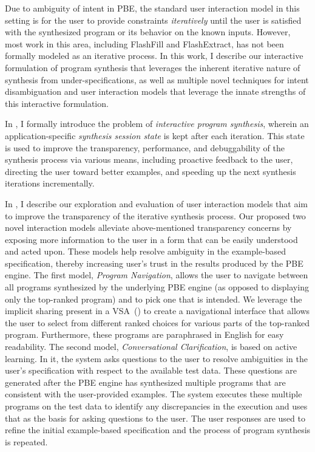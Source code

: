 Due to ambiguity of intent in PBE, the standard user interaction model in this setting is for the user to provide
constraints \emph{iteratively} until the user is satisfied with the synthesized program or its behavior on the known
inputs.
However, most work in this area, including FlashFill and FlashExtract, has not been formally modeled as an iterative
process.
In this work, I describe our interactive formulation of program synthesis that leverages the inherent iterative nature
of synthesis from under-specifications, as well as multiple novel techniques for intent disambiguation and user
interaction models that leverage the innate strengths of this interactive formulation.

In , I formally introduce the problem of \emph{interactive program synthesis}, wherein an
application-specific \emph{synthesis session state} is kept after each iteration.
This state is used to improve the transparency, performance, and debuggability of the synthesis process via various
means, including proactive feedback to the user, directing the user toward better examples, and speeding up the next
synthesis iterations incrementally.

In , I describe our exploration and evaluation of user interaction models that aim to
improve the transparency of the iterative synthesis process.
Our proposed two novel interaction models alleviate above\hyp{}mentioned transparency concerns
by exposing more information to the user in a form that can be easily understood and acted upon.
These models help resolve ambiguity in the example\hyp{}based specification, thereby increasing
user's trust in the results produced by the PBE engine.
The first model, \emph{Program Navigation}, allows the user to navigate
between all programs synthesized by the underlying PBE engine (as opposed to displaying only the
top-ranked program) and to pick one that is intended.
We leverage the implicit sharing present in a VSA~() to create a navigational interface that allows the
user to select from different ranked choices for various parts of the top-ranked program.
Furthermore, these programs are paraphrased in English for easy readability.
The second model, \emph{Conversational Clarification}, is based on active learning.
In it, the system asks questions to the user to resolve ambiguities in the user's
specification with respect to the available test data.
These questions are generated after the PBE engine has synthesized multiple programs that are consistent with the
user-provided examples.
The system executes these multiple programs on the test data to identify any discrepancies in the execution and uses
that as the basis for asking questions to the user.
The user responses are used to refine the initial example-based specification and the
process of program synthesis is repeated.


